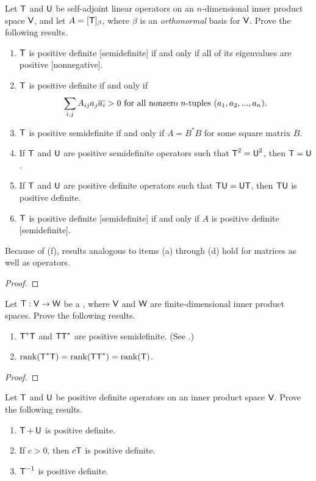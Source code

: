 \begin{exercise} \label{exercise 6.4.17}
Let \(\textsf{T}\) and \(\textsf{U}\) be self-adjoint linear operators on an \(n\)-dimensional inner product space \(\textsf{V}\), and let \(A = [\textsf{T}]_{\beta}\), where \(\beta\) is an \emph{orthonormal} basis for \(\textsf{V}\).
Prove the following results.
\begin{enumerate}
\item \(\textsf{T}\) is positive definite [semidefinite] if and only if all of its eigenvalues are positive [nonnegative].
\item \(\textsf{T}\) is positive definite if and only if
\[
    \sum_{i, j} A_{ij} a_j \overline{a_i} > 0 \text{ for all nonzero \(n\)-tuples } (a_1, a_2, ..., a_n).
\]
\item \(\textsf{T}\) is positive semidefinite if and only if \(A = B^* B\) for some square matrix \(B\).
\item If \(\textsf{T}\) and \(\textsf{U}\) are positive semidefinite operators such that \(\textsf{T}^2 = \textsf{U}^2\), then \(\textsf{T} = \textsf{U}\).
\item If \(\textsf{T}\) and \(\textsf{U}\) are positive definite operators such that \(\textsf{T}\textsf{U} = \textsf{U}\textsf{T}\), then \(\textsf{T}\textsf{U}\) is positive definite.
\item \(\textsf{T}\) is positive definite [semidefinite] if and only if \(A\) is positive definite [semidefinite].
\end{enumerate}
Because of (f), results analogous to items (a) through (d) hold for matrices as well as operators.
\end{exercise}

\begin{proof}
\end{proof}

\begin{exercise} \label{exercise 6.4.18}
Let \(\textsf{T}: \textsf{V} \to \textsf{W}\) be a \LTRAN{}, where \(\textsf{V}\) and \(\textsf{W}\) are finite-dimensional inner product spaces.
Prove the following results.
\begin{enumerate}
\item \(\textsf{T}^*\textsf{T}\) and \(\textsf{T}\textsf{T}^*\) are positive semidefinite. (See .)
\item \(\mathrm{rank}(\textsf{T}^*\textsf{T}) = \mathrm{rank}(\textsf{T}\textsf{T}^*) = \mathrm{rank}(\textsf{T})\).
\end{enumerate}
\end{exercise}

\begin{proof}
\end{proof}

\begin{exercise} \label{exercise 6.4.19}
Let \(\textsf{T}\) and \(\textsf{U}\) be positive definite operators on an inner product space \(\textsf{V}\).
Prove the following results.
\begin{enumerate}
\item \(\textsf{T} + \textsf{U}\) is positive definite.
\item If \(c > 0\), then \(c \textsf{T}\) is positive definite.
\item \(\textsf{T}^{-1}\) is positive definite.
\end{enumerate}
\end{exercise}

